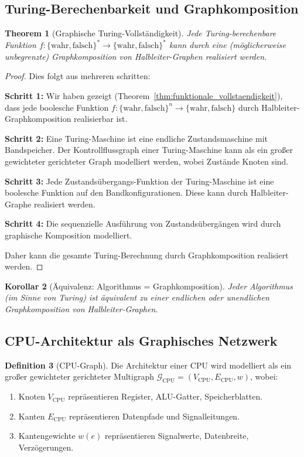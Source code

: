 \documentclass[12pt, a4paper]{article}
\newtheorem{theorem}{Theorem}[section]
\newtheorem{corollary}[theorem]{Korollar}
\theoremstyle{definition}
\newtheorem{definition}[theorem]{Definition}
\theoremstyle{remark}
\newcommand{\Bool}{\{\mathrm{wahr}, \mathrm{falsch}\}}
\newcommand{\Graph}{\mathcal{G}}
\begin{document}
\subsection{Turing-Berechenbarkeit und Graphkomposition}
\label{subsec:turing_graphkomposition}

\begin{theorem}[Graphische Turing-Vollständigkeit]
\label{thm:graphische_turing_vollstaendigkeit}
Jede Turing-berechenbare Funktion $f: \Bool^* \to \Bool^*$ kann durch eine (möglicherweise unbegrenzte) Graphkomposition von Halbleiter-Graphen realisiert werden.
\end{theorem}

\begin{proof}
Dies folgt aus mehreren schritten:

\textbf{Schritt 1:} Wir haben gezeigt (Theorem~\ref{thm:funktionale_vollstaendigkeit}), dass jede boolesche Funktion $f: \Bool^n \to \Bool$ durch Halbleiter-Graphkomposition realisierbar ist.

\textbf{Schritt 2:} Eine Turing-Maschine ist eine endliche Zustandsmaschine mit Bandspeicher. Der Kontrollflussgraph einer Turing-Maschine kann als ein großer gewichteter gerichteter Graph modelliert werden, wobei Zustände Knoten sind.

\textbf{Schritt 3:} Jede Zustandsübergangs-Funktion der Turing-Maschine ist eine boolesche Funktion auf den Bandkonfigurationen. Diese kann durch Halbleiter-Graphe realisiert werden.

\textbf{Schritt 4:} Die sequenzielle Ausführung von Zustandsübergängen wird durch graphische Komposition modelliert.

Daher kann die gesamte Turing-Berechnung durch Graphkomposition realisiert werden.
\end{proof}

\begin{corollary}[Äquivalenz: Algorithmus = Graphkomposition]
Jeder Algorithmus (im Sinne von Turing) ist äquivalent zu einer endlichen oder unendlichen Graphkomposition von Halbleiter-Graphen.
\end{corollary}

\subsection{CPU-Architektur als Graphisches Netzwerk}
\label{subsec:cpu_graphik}

\begin{definition}[CPU-Graph]
\label{def:cpu_graph}
Die Architektur einer CPU wird modelliert als ein großer gewichteter gerichteter Multigraph $\Graph_{\mathrm{CPU}} = (V_{\mathrm{CPU}}, E_{\mathrm{CPU}}, w)$, wobei:
\begin{enumerate}[label=(\alph*)]
  \item Knoten $V_{\mathrm{CPU}}$ repräsentieren Register, ALU-Gatter, Speicherblatten.
  \item Kanten $E_{\mathrm{CPU}}$ repräsentieren Datenpfade und Signalleitungen.
  \item Kantengewichte $w(e)$ repräsentieren Signalwerte, Datenbreite, Verzögerungen.
\end{enumerate}
\end{definition}
\end{document}
